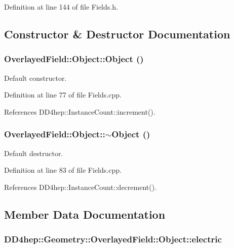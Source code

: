 Definition at line 144 of file Fields.h.

\subsection{Constructor \& Destructor Documentation}
\hypertarget{class_d_d4hep_1_1_geometry_1_1_overlayed_field_1_1_object_a5c62fce5f0a4f429ff6560940cbc94ab}{
\subsubsection[{Object}]{\setlength{\rightskip}{0pt plus 5cm}OverlayedField::Object::Object ()}}
\label{class_d_d4hep_1_1_geometry_1_1_overlayed_field_1_1_object_a5c62fce5f0a4f429ff6560940cbc94ab}


Default constructor. 

Definition at line 77 of file Fields.cpp.

References DD4hep::InstanceCount::increment().\hypertarget{class_d_d4hep_1_1_geometry_1_1_overlayed_field_1_1_object_ad8d5178e3718579c79f92a4bb740e57d}{
\subsubsection[{$\sim$Object}]{\setlength{\rightskip}{0pt plus 5cm}OverlayedField::Object::$\sim$Object ()}}
\label{class_d_d4hep_1_1_geometry_1_1_overlayed_field_1_1_object_ad8d5178e3718579c79f92a4bb740e57d}


Default destructor. 

Definition at line 83 of file Fields.cpp.

References DD4hep::InstanceCount::decrement().

\subsection{Member Data Documentation}
\hypertarget{class_d_d4hep_1_1_geometry_1_1_overlayed_field_1_1_object_a3bdf6ca218ef224725fa0a28e050c1a1}{
\subsubsection[{electric}]{ {\bf DD4hep::Geometry::OverlayedField::Object::electric}}}
\label{class_d_d4hep_1_1_geometry_1_1_overlayed_field_1_1_object_a3bdf6ca218ef224725fa0a28e050c1a1}


